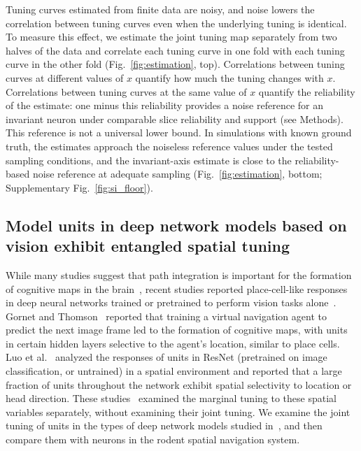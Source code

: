\documentclass[11pt]{article}
\begin{document}
Tuning curves estimated from finite data are noisy, and noise lowers the correlation between tuning curves even when the underlying tuning is identical. To measure this effect, we estimate the joint tuning map separately from two halves of the data and correlate each tuning curve in one fold with each tuning curve in the other fold (Fig.~\ref{fig:estimation}, top). Correlations between tuning curves at different values of $x$ quantify how much the tuning changes with $x$. Correlations between tuning curves at the same value of $x$ quantify the reliability of the estimate: one minus this reliability provides a noise reference for an invariant neuron under comparable slice reliability and support (see Methods). This reference is not a universal lower bound.
In simulations with known ground truth, the estimates approach the noiseless reference values under the tested sampling conditions, and the invariant-axis estimate is close to the reliability-based noise reference at adequate sampling (Fig.~\ref{fig:estimation}, bottom; Supplementary Fig.~\ref{fig:si_floor}).

\subsection{Model units in deep network models based on vision exhibit entangled spatial tuning}

While many studies suggest that path integration is important for the formation of cognitive maps in the brain~\cite{Mcnaughton2006,Burak2009,Cueva2018}, recent studies reported place-cell-like responses in deep neural networks trained or pretrained to perform vision tasks alone~\cite{Luo2024,Gornet2024automated}. Gornet and Thomson~\cite{Gornet2024automated} reported that training a virtual navigation agent to predict the next image frame led to the formation of cognitive maps, with units in certain hidden layers selective to the agent's location, similar to place cells. Luo et al.~\cite{Luo2024} analyzed the responses of units in ResNet (pretrained on image classification, or untrained) in a spatial environment and reported that a large fraction of units throughout the network exhibit spatial selectivity to location or head direction. These studies~\cite{Luo2024,Gornet2024automated} examined the marginal tuning to these spatial variables separately, without examining their joint tuning.
We examine the joint tuning of units in the types of deep network models studied in~\cite{Luo2024,Gornet2024automated}, and then compare them with neurons in the rodent spatial navigation system.
\end{document}
